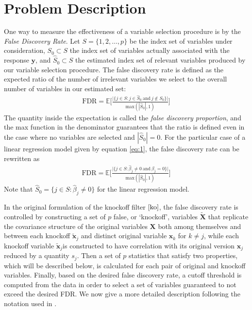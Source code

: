 \documentclass[]{scrartcl}
\newcommand{\1}[1]{\mathbbm{1}_{\left\{#1\right\}}}
\begin{document}
\section{Problem Description}
One way to measure the effectiveness of a variable selection procedure is by the \textit{False Discovery Rate}. Let $S = \{1, 2, \dots, p\}$ be the index set of variables under consideration, $S_{0} \subset S$ the index set of variables actually associated with the response $\mathbf{y}$, and $\widehat{S}_{0} \subset S$ the estimated index set of relevant variables produced by our variable selection procedure. The false discovery rate is defined as the expected ratio of the number of irrelevant variables we select to the overall number of variables in our estimated set:
\begin{align}\label{eq:2}
	\text{FDR} = \mathbb{E}\Bigg[\frac{\big|\{j \in S : j \in \widehat{S}_{0}\ \text{and}\ j \not\in S_{0}\} \big|}{\text{max}(|\widehat{S}_{0}|, 1)} \Bigg]
\end{align}
The quantity inside the expectation is called the \textit{false discovery proportion}, and the max function in the denominator guarantees that the ratio is defined even in the case where no variables are selected and $|\widehat{S}_{0}| = 0$. For the particular case of a linear regression model given by equation \eqref{eq:1}, the false discovery rate can be rewritten as 
\begin{align}\label{eq:3}
\text{FDR} = \mathbb{E}\Bigg[\frac{\big|\{j \in S : \widehat{\beta}_{j} \neq 0\ \text{and}\ \beta_{j} = 0\} \big|}{\text{max}(|\widehat{S}_{0}|, 1)} \Bigg]
\end{align}
Note that $\widehat{S}_{0} = \{j \in S: \widehat{\beta}_{j} \neq 0 \}$ for the linear regression model. 

\noindent
In the original formulation of the knockoff filter $\cite{ko}$, the false discovery rate is controlled by constructing a set of $p$ false, or `knockoff', variables $\widetilde{\mathbf{\mathbf{X}}}$ that replicate the covariance structure of the original variables $\mathbf{\mathbf{X}}$ both among themselves and between each knockoff $\widetilde{\mathbf{x}}_{j}$ and distinct original variable $\mathbf{x}_{k}$ for $k \neq j$, while each knockoff variable $\widetilde{\mathbf{x}}_{j}$is constructed to have correlation with its original version $\mathbf{x}_{j}$ reduced by a quantity $s_{j}$. Then a set of $p$ statistics that satisfy two properties, which will be described below, is calculated for each pair of original and knockoff variables. Finally, based on the desired false discovery rate, a cutoff threshold is computed from the data in order to select a set of variables guaranteed to not exceed the desired FDR. We now give a more detailed description following the notation used in \cite{ko, kohd}. 
\end{document}
